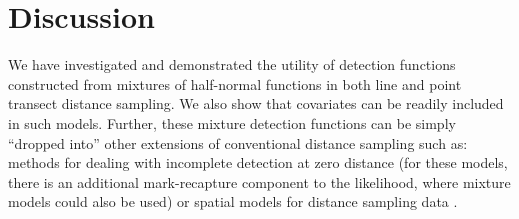 \documentclass[useAMS,referee,usenatbib]{biom}
\begin{document}

\section{Discussion}
\label{s:discuss}

We have investigated and demonstrated the utility of detection functions constructed from mixtures of half-normal functions in both line and point transect distance sampling. We also show that covariates can be readily included in such models. Further, these mixture detection functions can be simply ``dropped into'' other extensions of conventional distance sampling such as: methods for dealing with incomplete detection at zero distance \citep{Laake:2004tz, Laake:2011vm} (for these models, there is an additional mark-recapture component to the likelihood, where mixture models could also be used) or spatial models for distance sampling data \citep{Hedley:2004et, Miller:2013us}.
\end{document}
